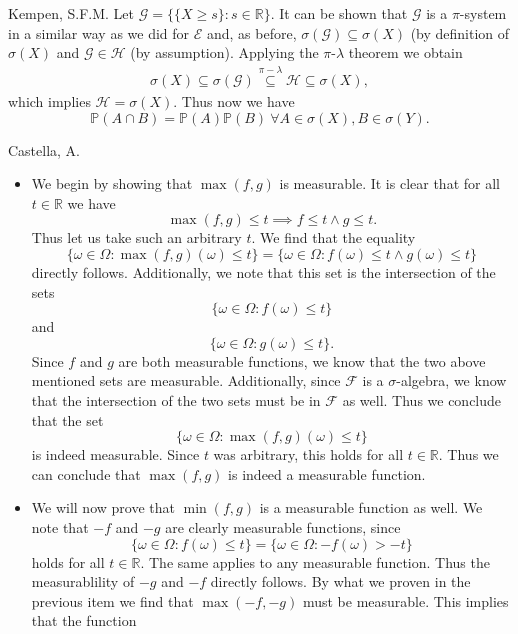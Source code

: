\begin{solution}[5.3]{Kempen, S.F.M.}
    \noindent Let $\mathcal{G} = \{\{X\geq s\}: s\in \mathbb{R}\}$. It can be shown that $\mathcal{G}$ is a $\pi$-system in a similar way as we did for $\mathcal{E}$ and, as before, $\sigma(\mathcal{G}) \subseteq \sigma(X)$ (by definition of $\sigma(X)$ and $\mathcal{G} \in \mathcal{H}$ (by assumption). Applying the $\pi$-$\lambda$ theorem we obtain
    \begin{align*}
        \sigma(X) \subseteq \sigma(\mathcal{G}) \stackrel{\pi-\lambda}{\subseteq} \mathcal{H} \subseteq \sigma(X),
    \end{align*}
    which implies $\mathcal{H} = \sigma(X)$. Thus now we have
    $$ \mathbb{P}(A\cap B) = \mathbb{P}(A)\mathbb{P}(B) \ \forall A\in \sigma(X), B\in \sigma(Y).  $$
\end{solution}


\begin{solution}[5.4]{Castella, A.}
    \begin{itemize}
        \item We begin by showing that $\max(f,g)$ is measurable. It is clear that for all $t \in \mathbb{R}$ we have
        $$
            \max(f,g) \leq t \implies f \leq t \land g \leq t.
        $$
        Thus let us take such an arbitrary $t$. We find that the equality
        $$
            \{\omega \in \Omega : \max(f,g)(\omega) \leq t\} = \{\omega \in \Omega : f(\omega) \leq t \land g(\omega) \leq t\}
        $$
        directly follows. Additionally, we note that this set is the intersection of the sets
        $$
            \{\omega \in \Omega : f(\omega) \leq t\}
        $$
        and
        $$
            \{\omega \in \Omega : g(\omega) \leq t\}.
        $$
        Since $f$ and $g$ are both measurable functions, we know that the two above mentioned sets are measurable. Additionally, since $\mathcal{F}$ is a $\sigma$-algebra, we know that the intersection of the two sets must be in $\mathcal{F}$ as well. Thus we conclude that the set
        $$
            \{\omega \in \Omega : \max(f, g)(\omega) \leq t\}
        $$
        is indeed measurable. Since $t$ was arbitrary, this holds for all $t \in \mathbb{R}$. Thus we can conclude that $\max(f,g)$ is indeed a measurable function.
        \item We will now prove that $\min(f,g)$ is a measurable function as well. We note that $-f$ and $-g$ are clearly measurable functions, since
        $$
            \{\omega \in \Omega : f(\omega) \leq t\} = \{\omega \in \Omega : -f(\omega) > -t\}
        $$
        holds for all $t \in \mathbb{R}$. The same applies to any measurable function. Thus the measurablility of $-g$ and $-f$ directly follows. By what we proven in the previous item we find that $\max(-f, -g)$ must be measurable. This implies that the function

\end{itemize}
\end{solution}
